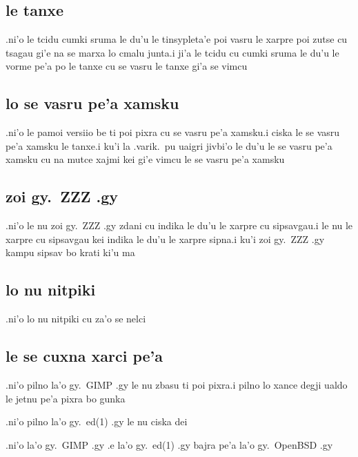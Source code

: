 \documentclass{report}
\begin{document}
\subsection{le tanxe}
.ni'o le tcidu cumki sruma le du'u le tinsypleta'e poi vasru le xarpre poi zutse cu tsagau gi'e na se marxa lo cmalu junta\@  .i ji'a le tcidu cu cumki sruma le du'u le vorme pe'a po le tanxe cu se vasru le tanxe gi'a se vimcu

\subsection{lo se vasru pe'a xamsku}
.ni'o le pamoi versiio be ti poi pixra cu se vasru pe'a xamsku\@  .i ciska le se vasru pe'a xamsku le tanxe\@  .i ku'i la .varik.\ pu uaigri jivbi'o le du'u le se vasru pe'a xamsku cu na mutce xajmi kei gi'e vimcu le se vasru pe'a xamsku

\subsection{zoi gy.\ ZZZ .gy}
.ni'o le nu zoi gy.\ ZZZ .gy zdani cu indika le du'u le xarpre cu sipsavgau\@  .i le nu le xarpre cu sipsavgau kei indika le du'u le xarpre sipna\@  .i ku'i zoi gy.\ ZZZ .gy kampu sipsav bo krati ki'u ma

\subsection{lo nu nitpiki}
.ni'o lo nu nitpiki cu za'o se nelci

\subsection{le se cuxna xarci pe'a}
.ni'o pilno la'o gy.\ GIMP .gy le nu zbasu ti poi pixra\@  .i pilno lo xance degji ualdo le jetnu pe'a pixra bo gunka

.ni'o pilno la'o gy.\ ed(1) .gy le nu ciska dei

.ni'o la'o gy.\ GIMP .gy .e la'o gy.\ ed(1) .gy bajra pe'a la'o gy.\ OpenBSD .gy
\end{document}
